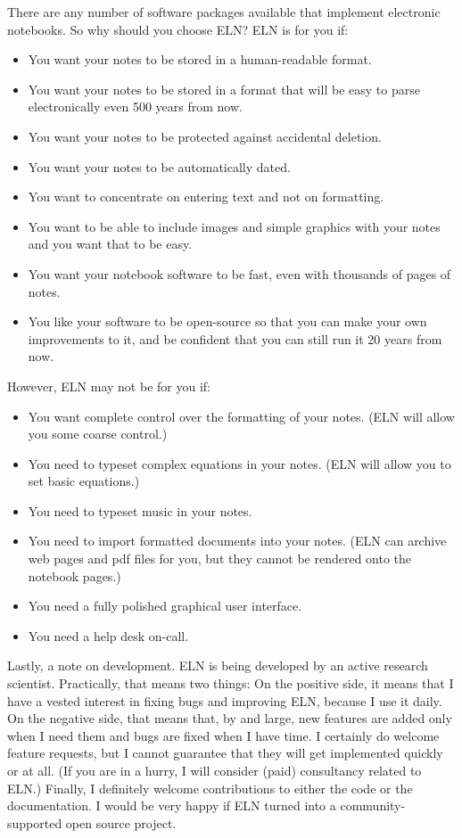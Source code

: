 \documentclass[11pt]{report}
\begin{document}
There are any
number of software packages available that implement electronic
notebooks. So why should you choose ELN? ELN is for you if:
\begin{itemize}
  \item You want your notes to be stored in a human-readable format.
  \item You want your notes to be stored in a format that will be easy to
    parse electronically even 500 years from now.
  \item You want your notes to be protected against accidental
    deletion.
  \item You want your notes to be automatically dated.
  \item You want to concentrate on entering text and not on
    formatting.
  \item You want to be able to include images and simple graphics with
    your notes and you want that to be easy.
  \item You want your notebook software to be fast, even with thousands
    of pages of notes.
  \item You like your software to be open-source so that you can make
    your own improvements to it, and be confident that you can still
    run it 20 years from now.
\end{itemize}

\noindent However, ELN may not be for you if:
\begin{itemize}
  \item You want complete control over the formatting of your notes.
    (ELN will allow you some coarse control.)
  \item You need to typeset complex equations in your notes. (ELN
    will allow you to set basic equations.)
  \item You need to typeset music in your notes.
  \item You need to import formatted documents into your notes. (ELN
    can archive web pages and pdf files for you, but they cannot be
    rendered onto the notebook pages.)
  \item You need a fully polished graphical user interface.
  \item You need a help desk on-call.
\end{itemize}
\noindent Lastly, a note on development. ELN is being developed by an
active research scientist. Practically, that means two things: On the
positive side, it means that I have a vested interest in fixing bugs
and improving ELN, because I use it daily. On the negative side, that
means that, by and large, new features are added only when I need them
and bugs are fixed when I have time. I certainly do welcome feature
requests, but I cannot guarantee that they will get implemented
quickly or at all. (If you are in a hurry, I will consider (paid)
consultancy related to ELN.) Finally, I definitely welcome
contributions to either the code or the documentation. I would be very
happy if ELN turned into a community-supported open source project.
\end{document}
